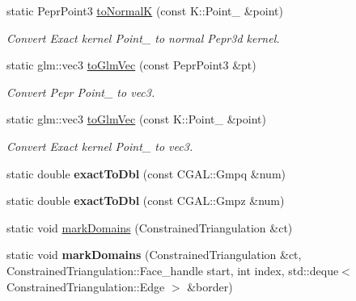 \begin{DoxyCompactItemize}
\mbox{\label{classpepr3d_1_1_triangle_detail_a49ed4eb7b270a5173db8257e822cac14}} 
static Pepr\+Point3 \mbox{\hyperlink{classpepr3d_1_1_triangle_detail_a49ed4eb7b270a5173db8257e822cac14}{to\+NormalK}} (const K\+::\+Point\+\_ \&point)
\begin{DoxyCompactList}\small\item\em Convert Exact kernel Point\+\_ to normal Pepr3d kernel. \end{DoxyCompactList}\item 
\mbox{\label{classpepr3d_1_1_triangle_detail_a013e7b3a720d433ce10ea3eed3438fc4}} 
static glm\+::vec3 \mbox{\hyperlink{classpepr3d_1_1_triangle_detail_a013e7b3a720d433ce10ea3eed3438fc4}{to\+Glm\+Vec}} (const Pepr\+Point3 \&pt)
\begin{DoxyCompactList}\small\item\em Convert Pepr Point\+\_ to vec3. \end{DoxyCompactList}\item 
\mbox{\label{classpepr3d_1_1_triangle_detail_a19a7cded9a34b708ac7e909d47c3b0a6}} 
static glm\+::vec3 \mbox{\hyperlink{classpepr3d_1_1_triangle_detail_a19a7cded9a34b708ac7e909d47c3b0a6}{to\+Glm\+Vec}} (const K\+::\+Point\+\_ \&point)
\begin{DoxyCompactList}\small\item\em Convert Exact kernel Point\+\_ to vec3. \end{DoxyCompactList}\item 
\mbox{\label{classpepr3d_1_1_triangle_detail_a3a270f31457d95be3039509a36f1559c}} 
static double {\bfseries exact\+To\+Dbl} (const C\+G\+A\+L\+::\+Gmpq \&num)
\item 
\mbox{\label{classpepr3d_1_1_triangle_detail_a0ca54d4a96e232c5ed34095e2133c99e}} 
static double {\bfseries exact\+To\+Dbl} (const C\+G\+A\+L\+::\+Gmpz \&num)
\item 
static void \mbox{\hyperlink{classpepr3d_1_1_triangle_detail_a0b2324c84ed90dc0e4ad7d14cdd5aa75}{mark\+Domains}} (Constrained\+Triangulation \&ct)
\item 
\mbox{\label{classpepr3d_1_1_triangle_detail_a42d9d3fc7908f325cf64118061c6dea5}} 
static void {\bfseries mark\+Domains} (Constrained\+Triangulation \&ct, Constrained\+Triangulation\+::\+Face\+\_\+handle start, int index, std\+::deque$<$ Constrained\+Triangulation\+::\+Edge $>$ \&border)
\end{DoxyCompactItemize}

